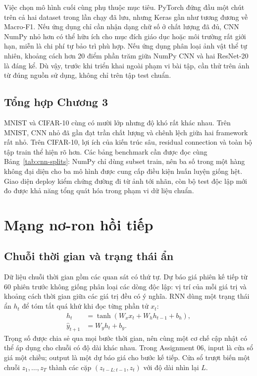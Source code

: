 \documentclass[12pt,a4paper]{report}
\begin{document}
Việc chọn mô hình cuối cùng phụ thuộc mục tiêu. PyTorch đứng đầu một chút trên cả hai dataset trong lần chạy đã lưu, nhưng Keras gần như tương đương về Macro-F1. Nếu ứng dụng chỉ cần nhận dạng chữ số ở chất lượng đã đủ, CNN NumPy nhỏ hơn có thể hữu ích cho mục đích giáo dục hoặc môi trường rất giới hạn, miễn là chi phí tự bảo trì phù hợp. Nếu ứng dụng phân loại ảnh vật thể tự nhiên, khoảng cách hơn 20 điểm phần trăm giữa NumPy CNN và hai ResNet-20 là đáng kể. Dù vậy, trước khi triển khai ngoài phạm vi bài tập, cần thử trên ảnh từ đúng nguồn sử dụng, không chỉ trên tập test chuẩn.

\section{Tổng hợp Chương 3}
MNIST và CIFAR-10 cùng có mười lớp nhưng độ khó rất khác nhau. Trên MNIST, CNN nhỏ đã gần đạt trần chất lượng và chênh lệch giữa hai framework rất nhỏ. Trên CIFAR-10, lợi ích của kiến trúc sâu, residual connection và toàn bộ tập train thể hiện rõ hơn. Các bảng benchmark cần được đọc cùng Bảng~\ref{tab:cnn-splits}: NumPy chỉ dùng subset train, nên ba số trong một hàng không đại diện cho ba mô hình được cung cấp điều kiện huấn luyện giống hệt. Giao diện deploy kiểm chứng đường đi từ ảnh tới nhãn, còn bộ test độc lập mới đo được khả năng tổng quát hóa trong phạm vi dữ liệu chuẩn.

\chapter{Mạng nơ-ron hồi tiếp}\label{ch:rnn}
\section{Chuỗi thời gian và trạng thái ẩn}
Dữ liệu chuỗi thời gian gồm các quan sát có thứ tự. Dự báo giá phiên kế tiếp từ 60 phiên trước không giống phân loại các dòng độc lập: vị trí của mỗi giá trị và khoảng cách thời gian giữa các giá trị đều có ý nghĩa. RNN dùng một trạng thái ẩn $h_t$ để tóm tắt quá khứ khi đọc từng phần tử $x_t$:
\begin{align}h_t&=\tanh(W_xx_t+W_hh_{t-1}+b_h),\\\hat y_{t+1}&=W_yh_t+b_y.\end{align}
Trọng số được chia sẻ qua mọi bước thời gian, nên cùng một cơ chế cập nhật có thể áp dụng cho chuỗi có độ dài khác nhau. Trong Assignment 06, input là cửa sổ giá một chiều; output là một dự báo giá cho bước kế tiếp. Cửa sổ trượt biến một chuỗi $z_1,\ldots,z_T$ thành các cặp $(z_{t-L:t-1},z_t)$ với độ dài nhìn lại $L$.
\end{document}
